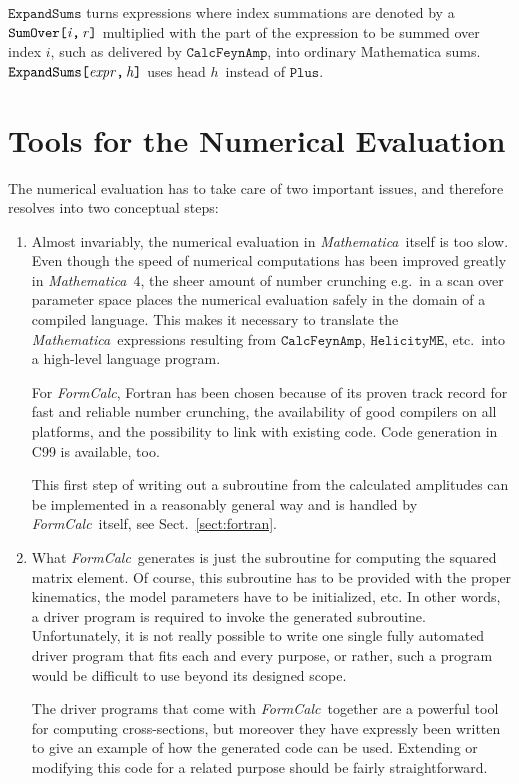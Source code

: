 \documentclass[twoside,11pt]{article}
\def\FC{\textit{FormCalc}}
\def\mma{\textit{Mathematica}}
\def\Var#1{\ensuremath{\mathit{#1}}}
\def\Vh{\Var{h}}
\def\Vi{\Var{i}}
\def\Vr{\Var{r}}
\def\Code#1{\ensuremath{\texttt{#1}}}
\def\eg{e.g.\ }
\begin{document}
\Code{ExpandSums} turns expressions where index summations are denoted 
by a \Code{SumOver[\Vi,\,\Vr]} multiplied with the part of the 
expression to be summed over index \Vi, such as delivered by 
\Code{CalcFeynAmp}, into ordinary Mathematica sums.  
\Code{ExpandSums[\Var{expr},\,\Vh]} uses head \Vh\ instead of 
\Code{Plus}.


\section{Tools for the Numerical Evaluation}
%

The numerical evaluation has to take care of two important issues, and 
therefore resolves into two conceptual steps:
\begin{enumerate}
\item
Almost invariably, the numerical evaluation in \mma\ itself is too slow.
Even though the speed of numerical computations has been improved greatly
in \mma\ 4, the sheer amount of number crunching \eg in a scan over
parameter space places the numerical evaluation safely in the domain of a
compiled language.  This makes it necessary to translate the \mma\
expressions resulting from \Code{CalcFeynAmp}, \Code{HelicityME}, etc.\ into
a high-level language program.

For \FC, Fortran has been chosen because of its proven track record for 
fast and reliable number crunching, the availability of good compilers 
on all platforms, and the possibility to link with existing code.  
Code generation in C99 is available, too.

This first step of writing out a subroutine from the calculated 
amplitudes can be implemented in a reasonably general way and is handled 
by \FC\ itself, see Sect.\ \ref{sect:fortran}.

\item
What \FC\ generates is just the subroutine for computing the squared
matrix element.  Of course, this subroutine has to be provided with the
proper kinematics, the model parameters have to be initialized, etc.  In
other words, a driver program is required to invoke the generated
subroutine.  Unfortunately, it is not really possible to write one single
fully automated driver program that fits each and every purpose, or
rather, such a program would be difficult to use beyond its designed
scope.

The driver programs that come with \FC\ together are a powerful tool for
computing cross-sections, but moreover they have expressly been written
to give an example of how the generated code can be used.  Extending or
modifying this code for a related purpose should be fairly
straightforward.
\end{enumerate}
\end{document}
